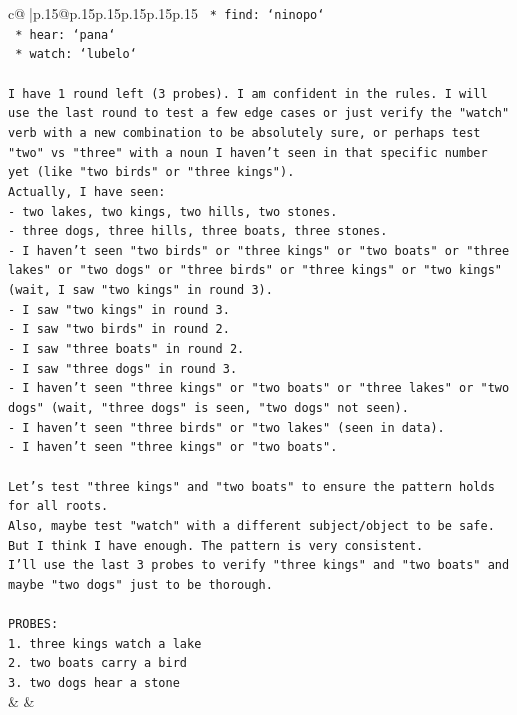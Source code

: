 \documentclass{article}
\begin{document}
{\begin{supertabular}{c@{$\;$}|p{.15\linewidth}@{}p{.15\linewidth}p{.15\linewidth}p{.15\linewidth}p{.15\linewidth}p{.15\linewidth}}
{{{\texttt{    *   find: `ninopo`} \\
\texttt{    *   hear: `pana`} \\
\texttt{    *   watch: `lubelo`} \\
\\ 
\texttt{I have 1 round left (3 probes). I am confident in the rules. I will use the last round to test a few edge cases or just verify the "watch" verb with a new combination to be absolutely sure, or perhaps test "two" vs "three" with a noun I haven't seen in that specific number yet (like "two birds" or "three kings").} \\
\texttt{Actually, I have seen:} \\
\texttt{{-} two lakes, two kings, two hills, two stones.} \\
\texttt{{-} three dogs, three hills, three boats, three stones.} \\
\texttt{{-} I haven't seen "two birds" or "three kings" or "two boats" or "three lakes" or "two dogs" or "three birds" or "three kings" or "two kings" (wait, I saw "two kings" in round 3).} \\
\texttt{{-} I saw "two kings" in round 3.} \\
\texttt{{-} I saw "two birds" in round 2.} \\
\texttt{{-} I saw "three boats" in round 2.} \\
\texttt{{-} I saw "three dogs" in round 3.} \\
\texttt{{-} I haven't seen "three kings" or "two boats" or "three lakes" or "two dogs" (wait, "three dogs" is seen, "two dogs" not seen).} \\
\texttt{{-} I haven't seen "three birds" or "two lakes" (seen in data).} \\
\texttt{{-} I haven't seen "three kings" or "two boats".} \\
\\ 
\texttt{Let's test "three kings" and "two boats" to ensure the pattern holds for all roots.} \\
\texttt{Also, maybe test "watch" with a different subject/object to be safe.} \\
\texttt{But I think I have enough. The pattern is very consistent.} \\
\texttt{I'll use the last 3 probes to verify "three kings" and "two boats" and maybe "two dogs" just to be thorough.} \\
\\ 
\texttt{PROBES:} \\
\texttt{1. three kings watch a lake} \\
\texttt{2. two boats carry a bird} \\
\texttt{3. two dogs hear a stone} \\
            }
        }
    }
    & & \\ \\


\end{supertabular}}
\end{document}

